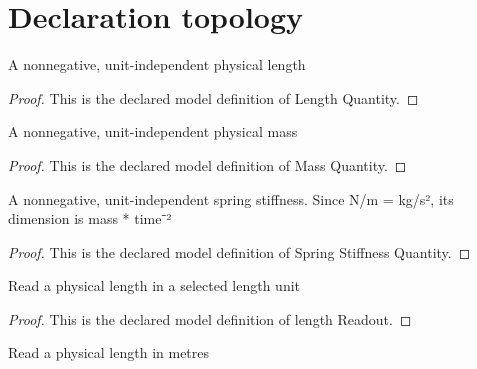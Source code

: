 \section{Declaration topology}
\begin{definition}
  \label{def:physics:phyx-mini-0694:phyxminiproblems-problemphyxmini0694-lengthquantity}
  A nonnegative, unit-independent physical length
\end{definition}
\begin{proof}
  This is the declared model definition of Length Quantity.
\end{proof}
\begin{definition}
  \label{def:physics:phyx-mini-0694:phyxminiproblems-problemphyxmini0694-massquantity}
  A nonnegative, unit-independent physical mass
\end{definition}
\begin{proof}
  This is the declared model definition of Mass Quantity.
\end{proof}
\begin{definition}
  \label{def:physics:phyx-mini-0694:phyxminiproblems-problemphyxmini0694-springstiffnessquantity}
  A nonnegative, unit-independent spring stiffness. Since N/m = kg/s², its dimension is mass * time⁻²
\end{definition}
\begin{proof}
  This is the declared model definition of Spring Stiffness Quantity.
\end{proof}
\begin{definition}
  \label{def:physics:phyx-mini-0694:phyxminiproblems-problemphyxmini0694-lengthreadout}
  Read a physical length in a selected length unit
\end{definition}
\begin{proof}
  This is the declared model definition of length Readout.
\end{proof}
\begin{definition}
  \label{def:physics:phyx-mini-0694:phyxminiproblems-problemphyxmini0694-lengthinmeters}
  Read a physical length in metres
\end{definition}
